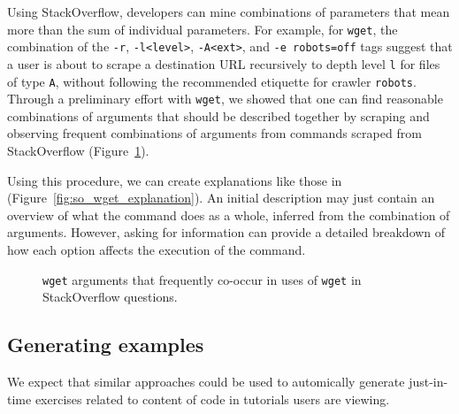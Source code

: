 Using StackOverflow, developers can mine combinations of parameters that mean more than the sum of individual parameters.
For example, for \texttt{wget}, the combination of the \texttt{-r}, \texttt{-l<level>}, \texttt{-A<ext>}, and \texttt{-e robots=off} tags suggest that a user is about to scrape a destination URL recursively to depth level \texttt{l} for files of type \texttt{A}, without following the recommended etiquette for crawler \texttt{robots}.
Through a preliminary effort with \texttt{wget}, we showed that one can find reasonable combinations of arguments that should be described together by scraping and observing frequent combinations of arguments from commands scraped from StackOverflow (Figure~\ref{fig:wget_arguments}).

Using this procedure, we can create explanations like those in (Figure~\ref{fig:so_wget_explanation}).
An initial description may just contain an overview of what the command does as a whole, inferred from the combination of arguments.
However, asking for information can provide a detailed breakdown of how each option affects the execution of the command.

\begin{figure}
\caption{\texttt{wget} arguments that frequently co-occur in uses of \texttt{wget} in StackOverflow questions. }
\label{fig:wget_arguments}
\end{figure}


\subsection{Generating examples}

We expect that similar approaches could be used to automically generate just-in-time exercises related to content of code in tutorials users are viewing. 

